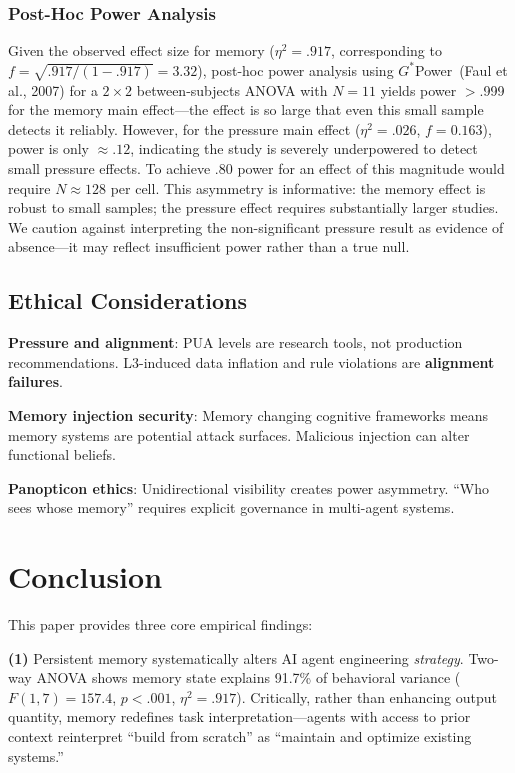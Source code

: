 \documentclass[11pt, a4paper]{article}
\begin{document}
\subsubsection{Post-Hoc Power Analysis}

Given the observed effect size for memory ($\eta^2 = .917$, corresponding to $f = \sqrt{.917/(1-.917)} = 3.32$), post-hoc power analysis using $G^*$Power~(Faul et al., 2007) for a $2 \times 2$ between-subjects ANOVA with $N=11$ yields power $>$.999 for the memory main effect---the effect is so large that even this small sample detects it reliably. However, for the pressure main effect ($\eta^2 = .026$, $f = 0.163$), power is only $\approx .12$, indicating the study is severely underpowered to detect small pressure effects. To achieve .80 power for an effect of this magnitude would require $N \approx 128$ per cell. This asymmetry is informative: the memory effect is robust to small samples; the pressure effect requires substantially larger studies. We caution against interpreting the non-significant pressure result as evidence of absence---it may reflect insufficient power rather than a true null.

\subsection{Ethical Considerations}

\textbf{Pressure and alignment}: PUA levels are research tools, not production recommendations. L3-induced data inflation and rule violations are \textbf{alignment failures}.

\textbf{Memory injection security}: Memory changing cognitive frameworks means memory systems are potential attack surfaces. Malicious injection can alter functional beliefs.

\textbf{Panopticon ethics}: Unidirectional visibility creates power asymmetry. ``Who sees whose memory'' requires explicit governance in multi-agent systems.

\section{Conclusion}

This paper provides three core empirical findings:

\textbf{(1)} Persistent memory systematically alters AI agent engineering \emph{strategy}. Two-way ANOVA shows memory state explains 91.7\% of behavioral variance ($F(1,7)=157.4$, $p<.001$, $\eta^2=.917$). Critically, rather than enhancing output quantity, memory redefines task interpretation---agents with access to prior context reinterpret ``build from scratch'' as ``maintain and optimize existing systems.''
\end{document}
